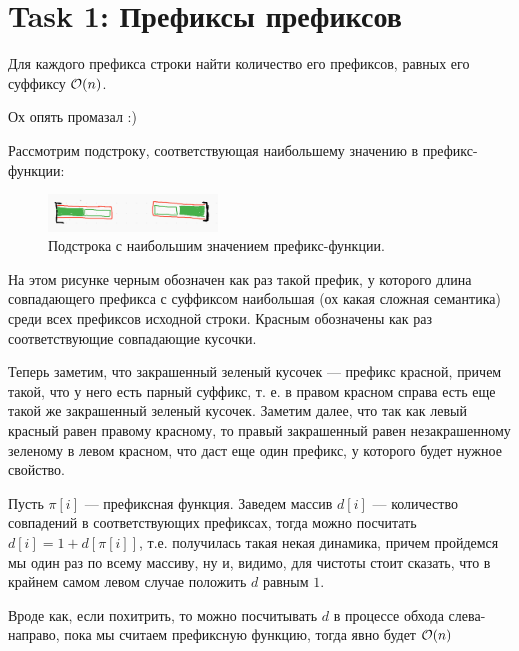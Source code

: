 \section{Task 1: Префиксы префиксов}
\begin{task}
    Для каждого префикса строки найти количество его префиксов, равных его суффиксу $\mathcal{O}(n)$.
\end{task}

\begin{solution}
    Ох опять промазал :)

    Рассмотрим подстроку, соответствующая наибольшему значению в префикс-функции:
    \begin{figure}[H]
        \centering
        \includegraphics[width=0.4\textwidth]{pics/1.png}
        \caption{Подстрока с наибольшим значением префикс-функции.}
    \end{figure}
    На этом рисунке черным обозначен как раз такой префик, у которого длина совпадающего префикса с суффиксом наибольшая (ох какая сложная семантика) среди всех префиксов исходной строки. Красным обозначены как раз соответствующие совпадающие кусочки.

    Теперь заметим, что закрашенный зеленый кусочек --- префикс красной, причем такой, что у него есть парный суффикс, т. е. в правом красном справа есть еще такой же закрашенный зеленый кусочек. Заметим далее, что так как левый красный равен правому красному, то правый закрашенный равен незакрашенному зеленому в левом красном, что даст еще один префикс, у которого будет нужное свойство.

    Пусть $\pi[i]$ --- префиксная функция. Заведем массив $d[i]$ --- количество совпадений в соответствующих префиксах, тогда можно посчитать $d[i] = 1 + d[\pi[i]]$, т.е. получилась такая некая динамика, причем пройдемся мы один раз по всему массиву, ну и, видимо, для чистоты стоит сказать, что в крайнем самом левом случае положить $d$ равным $1$.

    \begin{remark}
        Вроде как, если похитрить, то можно посчитывать $d$ в процессе обхода слева-направо, пока мы считаем префиксную функцию, тогда явно будет $\mathcal{O}(n)$
    \end{remark}
\end{solution}